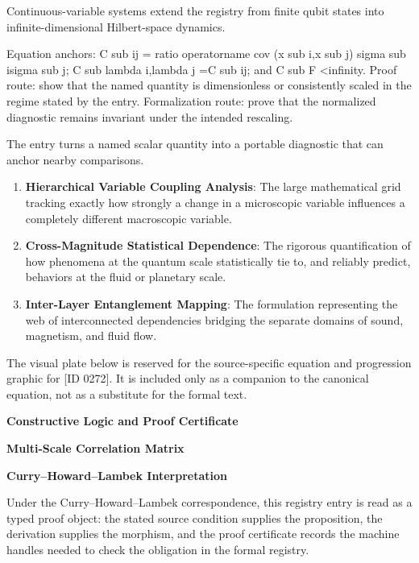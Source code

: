 Continuous-variable systems extend the registry from finite qubit states into infinite-dimensional Hilbert-space dynamics.

Equation anchors: C sub ij = ratio operatorname cov (x sub i,x sub j) sigma sub isigma sub j; C sub lambda i,lambda j =C sub ij; and C sub F <infinity. Proof route: show that the named quantity is dimensionless or consistently scaled in the regime stated by the entry. Formalization route: prove that the normalized diagnostic remains invariant under the intended rescaling.

The entry turns a named scalar quantity into a portable diagnostic that can anchor nearby comparisons.
\endgroup

\begin{enumerate}[leftmargin=1.6em,itemsep=6pt,topsep=4pt]
\item \textbf{Hierarchical Variable Coupling Analysis}: The large mathematical grid tracking exactly how strongly a change in a microscopic variable influences a completely different macroscopic variable.
\item \textbf{Cross-Magnitude Statistical Dependence}: The rigorous quantification of how phenomena at the quantum scale statistically tie to, and reliably predict, behaviors at the fluid or planetary scale.
\item \textbf{Inter-Layer Entanglement Mapping}: The formulation representing the web of interconnected dependencies bridging the separate domains of sound, magnetism, and fluid flow.
\end{enumerate}

\begingroup\footnotesize\sloppy
The visual plate below is reserved for the source-specific equation and progression graphic for [ID 0272]. It is included only as a companion to the canonical equation, not as a substitute for the formal text.
\par\endgroup
\ifTZPDarkEdition
{}
\fi

\clearpage
\begingroup\tzpsupportsetup
\noindent\textbf{\fontsize{10.8pt}{12.8pt}\selectfont [ID 0272] Constructive Logic and Proof Certificate}\par
\noindent\textbf{\fontsize{10pt}{12pt}\selectfont Multi-Scale Correlation Matrix}\par
\vspace{0.45em}
\begingroup
\footnotesize
\setlength{\parskip}{0.22em}
\setlength{\parindent}{0pt}
\noindent\textbf{Curry--Howard--Lambek Interpretation}\par
Under the Curry--Howard--Lambek correspondence, this registry entry is read as a typed proof
object: the stated source condition supplies the proposition, the derivation supplies the
morphism, and the proof certificate records the machine handles needed to check the obligation
in the formal registry.


